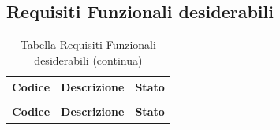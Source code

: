 \documentclass[a4paper,12pt]{article}
\begin{document}
\subsection{Requisiti Funzionali desiderabili} \label{subsection:requisiti_funzionali_desiderabili}
\begin{center}
\renewcommand{\arraystretch}{1.5}
\begin{longtable}{|c|p{8.5cm}|>{\centering\arraybackslash}p{4cm}|}

\hline
\rowcolor{gray!60}
\textbf{Codice} & \textbf{Descrizione} & \textbf{Stato} \\
\hline
\endfirsthead
\caption[]{Tabella Requisiti Funzionali desiderabili (continua)} \\
\hline
\rowcolor{gray!60}
\textbf{Codice} & \textbf{Descrizione} & \textbf{Stato} \\
\hline
\endhead


\end{longtable}
\end{center}
\end{document}
